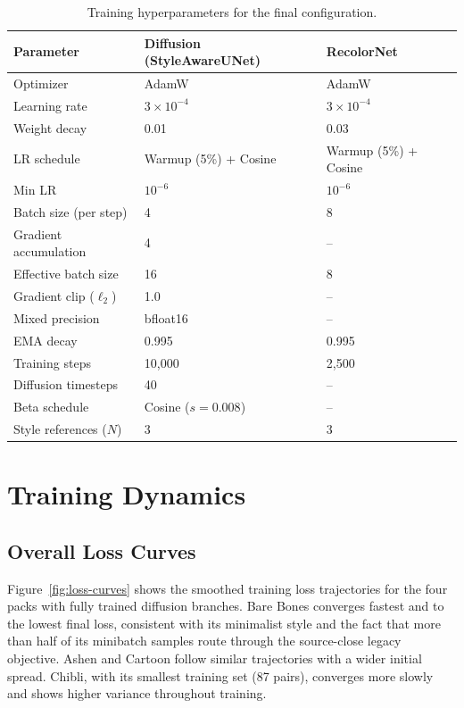 \begin{table}[htbp]
    \centering
    \caption{Training hyperparameters for the final configuration.}
    \label{tab:training-config}
    \begin{tabular}{@{}lll@{}}
        \toprule
        Parameter & Diffusion (StyleAwareUNet) & RecolorNet \\
        \midrule
        Optimizer & AdamW & AdamW \\
        Learning rate & $3 \times 10^{-4}$ & $3 \times 10^{-4}$ \\
        Weight decay & 0.01 & 0.03 \\
        LR schedule & Warmup (5\%) + Cosine & Warmup (5\%) + Cosine \\
        Min LR & $10^{-6}$ & $10^{-6}$ \\
        Batch size (per step) & 4 & 8 \\
        Gradient accumulation & 4 & -- \\
        Effective batch size & 16 & 8 \\
        Gradient clip ($\ell_2$) & 1.0 & -- \\
        Mixed precision & bfloat16 & -- \\
        EMA decay & 0.995 & 0.995 \\
        Training steps & 10,000 & 2,500 \\
        Diffusion timesteps & 40 & -- \\
        Beta schedule & Cosine ($s=0.008$) & -- \\
        Style references ($N$) & 3 & 3 \\
        \bottomrule
    \end{tabular}
\end{table}

\section{Training Dynamics}

\subsection{Overall Loss Curves}

Figure~\ref{fig:loss-curves} shows the smoothed training loss trajectories for
the four packs with fully trained diffusion branches. Bare Bones converges
fastest and to the lowest final loss, consistent with its minimalist style and
the fact that more than half of its minibatch samples route through the
source-close legacy objective. Ashen and Cartoon follow similar trajectories
with a wider initial spread. Chibli, with its smallest training set (87 pairs),
converges more slowly and shows higher variance throughout training.

